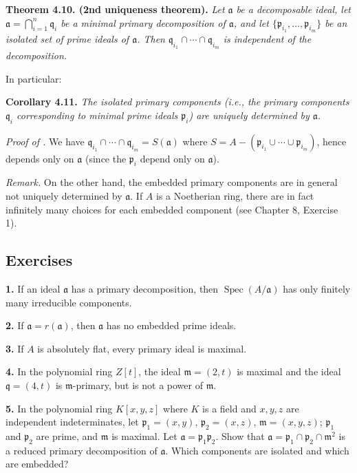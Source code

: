 \noindent\textbf{Theorem 4.10. (2nd uniqueness theorem).} \emph{Let \(\mathfrak a\) be a decomposable ideal, let \(\mathfrak a=\bigcap_{i=1}^n\mathfrak q_i\) be a minimal primary decomposition of \(\mathfrak a\), and let \(\{\mathfrak p_{i_1},\ldots,\mathfrak p_{i_m}\}\) be an isolated set of prime ideals of \(\mathfrak a\). Then \(\mathfrak q_{i_1}\cap\cdots\cap\mathfrak q_{i_m}\) is independent of the decomposition.}

In particular:

\noindent\textbf{Corollary 4.11.} \emph{The isolated primary components (i.e., the primary components \(\mathfrak q_i\) corresponding to minimal prime ideals \(\mathfrak p_i\)) are uniquely determined by \(\mathfrak a\).}

\noindent\emph{Proof of .} We have \(\mathfrak q_{i_1}\cap\cdots\cap\mathfrak q_{i_m}=S(\mathfrak a)\) where \(S=A-(\mathfrak p_{i_1}\cup\cdots\cup\mathfrak p_{i_m})\), hence depends only on \(\mathfrak a\) (since the \(\mathfrak p_i\) depend only on \(\mathfrak a\)). \proofbox

\noindent\emph{Remark.} On the other hand, the embedded primary components are in general not uniquely determined by \(\mathfrak a\). If \(A\) is a Noetherian ring, there are in fact infinitely many choices for each embedded component (see Chapter 8, Exercise 1).

\subsection{Exercises}

\noindent\textbf{1.} If an ideal \(\mathfrak a\) has a primary decomposition, then \(\operatorname{Spec}(A/\mathfrak a)\) has only finitely many irreducible components.

\noindent\textbf{2.} If \(\mathfrak a=r(\mathfrak a)\), then \(\mathfrak a\) has no embedded prime ideals.

\noindent\textbf{3.} If \(A\) is absolutely flat, every primary ideal is maximal.

\noindent\textbf{4.} In the polynomial ring \(Z[t]\), the ideal \(\mathfrak m=(2,t)\) is maximal and the ideal \(\mathfrak q=(4,t)\) is \(\mathfrak m\)-primary, but is not a power of \(\mathfrak m\).

\noindent\textbf{5.} In the polynomial ring \(K[x,y,z]\) where \(K\) is a field and \(x,y,z\) are independent indeterminates, let \(\mathfrak p_1=(x,y)\), \(\mathfrak p_2=(x,z)\), \(\mathfrak m=(x,y,z)\); \(\mathfrak p_1\) and \(\mathfrak p_2\) are prime, and \(\mathfrak m\) is maximal. Let \(\mathfrak a=\mathfrak p_1\mathfrak p_2\). Show that \(\mathfrak a=\mathfrak p_1\cap\mathfrak p_2\cap\mathfrak m^2\) is a reduced primary decomposition of \(\mathfrak a\). Which components are isolated and which are embedded?


